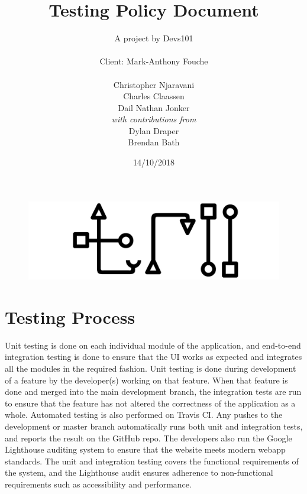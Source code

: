 \documentclass[12pt]{article}
\title{Testing Policy Document}
\author{A project by Devs101\\ \\
    Client: Mark-Anthony Fouche\\ \\
    Christopher Njaravani\\
    Charles Claassen\\
    Dail Nathan Jonker\\
    \textit{with contributions from}\\
    Dylan Draper\\
    Brendan Bath\\
    }
\date{14/10/2018}
\begin{document}
    
    \maketitle
    \begin{figure}[H]
        \includegraphics[width=\linewidth]{logo.jpg}
        \label{fig:logo}
    \end{figure}
    \newpage
    \section{Testing Process}
    Unit testing is done on each individual module of the application, and end-to-end integration
    testing is done to ensure that the UI works as expected and integrates all the modules in the 
    required fashion. Unit testing is done during development of a feature by the developer(s) working
    on that feature. When that feature is done and merged into the main development branch, the
    integration tests are run to ensure that the feature has not altered the correctness of the
    application as a whole. Automated testing is also performed on Travis CI. Any pushes to
    the development or master branch automatically runs both unit and integration tests, and
    reports the result on the GitHub repo. The developers also run the Google Lighthouse
    auditing system to ensure that the website meets modern webapp standards. The unit and
    integration testing covers the functional requirements of the system, and the Lighthouse audit
    ensures adherence to non-functional requirements such as accessibility and performance.
    
\end{document}
